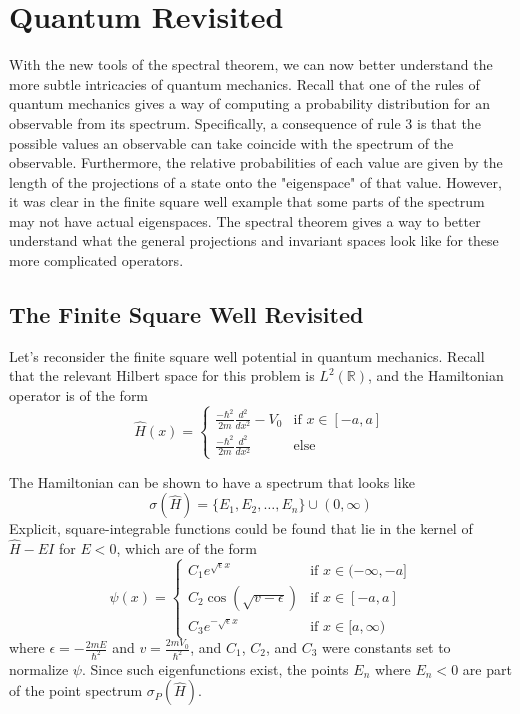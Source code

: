 \section{Quantum Revisited}
With the new tools of the spectral theorem, we can now better understand the
more subtle intricacies of quantum mechanics. Recall that one of the rules of
quantum mechanics gives a way of computing a probability distribution for an
observable from its spectrum. Specifically, a consequence of rule 3 is that the
possible values an observable can take coincide with the spectrum of the
observable. Furthermore, the relative probabilities of each value are given by
the length of the projections of a state onto the "eigenspace" of that value.
However, it was clear in the finite square well example that some parts of the
spectrum may not have actual eigenspaces. The spectral theorem gives a way to
better understand what the general projections and invariant spaces look like
for these more complicated operators.

\subsection{The Finite Square Well Revisited}
Let's reconsider the finite square well potential in quantum mechanics. Recall
that the relevant Hilbert space for this problem is $L^2(\mathbb{R})$, and the
Hamiltonian operator is of the form
\[
    \hat{H}(x) =
    \begin{cases}
        \frac{-\hbar^2}{2m}\frac{d^2}{dx^2} - V_0& \text{if } x\in[-a,a]\\
        \frac{-\hbar^2}{2m}\frac{d^2}{dx^2} &\text{else}
    \end{cases}
\]

The Hamiltonian can be shown to have a spectrum that looks like
\[
    \sigma(\hat{H}) = \{E_1, E_2,\hdots,E_n\} \cup (0,\infty)
\]
Explicit, square-integrable functions could be found that lie in the kernel of
$\hat{H} - EI$ for $E < 0$, which are of the form
\[
    \psi(x) =
    \begin{cases}
        C_1e^{\sqrt{\epsilon}x}& \text{if } x\in(-\infty,-a]\\
        C_2\cos(\sqrt{v-\epsilon})& \text{if } x\in[-a,a]\\
        C_3e^{-\sqrt{\epsilon}x}& \text{if } x\in [a, \infty)
    \end{cases}
\]
where $\epsilon = -\frac{2mE}{\hbar^2}$ and $v=\frac{2mV_0}{\hbar^2}$, and
$C_1$, $C_2$, and $C_3$ were constants set to normalize $\psi$. Since such
eigenfunctions exist, the points $E_n$ where $E_n<0$ are part of the point
spectrum $\sigma_P(\hat{H})$.

